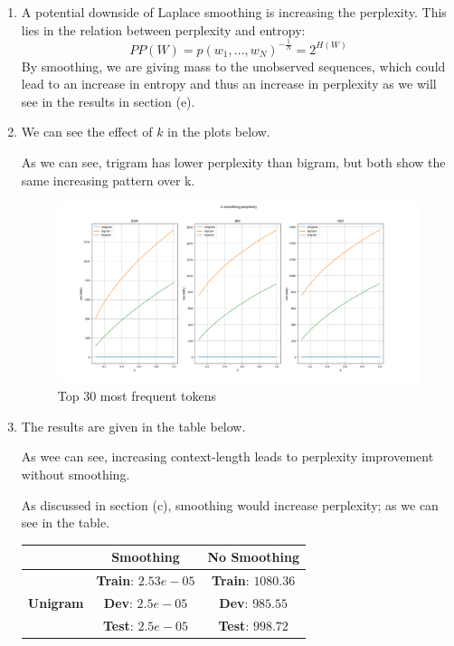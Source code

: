 \documentclass[12pt]{article}
\begin{document}
\begin{center}
\begin{enumerate}[label=(\alph*)]
			\item A potential downside of Laplace smoothing is increasing the perplexity. This lies in the relation between perplexity and entropy:
			\[
			PP(W)=p(w_1,\dots,w_N)^{-\frac{1}{N}}=2^{H(W)}
			\]
			By smoothing, we are giving mass to the unobserved sequences, which could lead to an increase in entropy and thus an increase in perplexity as we will see in the results in section (e).
			
			\item We can see the effect of $k$ in the plots below.
			
			As we can see, trigram has lower perplexity than bigram, but both show the same increasing pattern over k.
			
			\begin{figure}[H]
				\centering
				\includegraphics[width=\textwidth]{smooth.png}
				
				\caption{Top 30 most frequent tokens}
			\end{figure}
			
			\item The results are given in the table below.
			
			As wee can see, increasing context-length leads to perplexity improvement without smoothing.
			
			As discussed in section (c), smoothing would increase perplexity; as we can see in the table.
			
			\begin{table}[H]
				\centering
				\begin{tabular}{|c|c|c|}
					\hline
					&\multicolumn{1}{c|}{\textbf{Smoothing}}&\multicolumn{1}{c|}{\textbf{No Smoothing}} \\
					\hline
					& \textbf{Train}: $2.53e-05$ & \textbf{Train}: $1080.36$  \\
					\textbf{Unigram} & \textbf{Dev}: $2.5e-05$ & \textbf{Dev}: $985.55$ \\
					& \textbf{Test}: $2.5e-05$ & \textbf{Test}: $998.72$ \\
					\hline
					

\end{tabular}
\end{table}
\end{enumerate}
\end{center}
\end{document}
